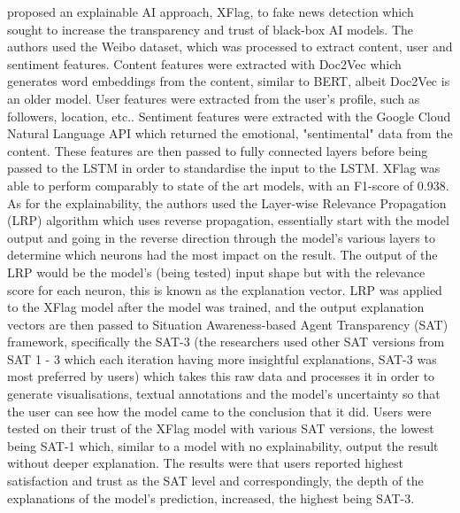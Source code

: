 \documentclass[stu,12pt,floatsintext,donotrepeattitle]{apa7}
\begin{document}
\textcite{Xflag} proposed an explainable AI approach, XFlag, to fake news detection which sought to increase the transparency and trust of black-box AI models. The authors used the Weibo dataset, which was processed to extract content, user and sentiment features. Content features were extracted with Doc2Vec which generates word embeddings from the content, similar to BERT, albeit Doc2Vec is an older model. User features were extracted from the user's profile, such as followers, location, etc.. Sentiment features were extracted with the Google Cloud Natural Language API which returned the emotional, "sentimental" data from the content. These features are then passed to fully connected layers before being passed to the LSTM in order to standardise the input to the LSTM. XFlag was able to perform comparably to state of the art models, with an F1-score of 0.938. As for the explainability, the authors used the Layer-wise Relevance Propagation (LRP) algorithm which uses reverse propagation, essentially start with the model output and going in the reverse direction through the model's various layers to determine which neurons had the most impact on the result. The output of the LRP would be the model's (being tested) input shape but with the relevance score for each neuron, this is known as the explanation vector. LRP was applied to the XFlag model after the model was trained, and the output explanation vectors are then passed to Situation Awareness-based Agent Transparency (SAT) framework, specifically the SAT-3 (the researchers used other SAT versions from SAT 1 - 3 which each iteration having more insightful explanations, SAT-3 was most preferred by users) which takes this raw data and processes it in order to generate visualisations, textual annotations and the model's uncertainty so that the user can see how the model came to the conclusion that it did. Users were tested on their trust of the XFlag model with various SAT versions, the lowest being SAT-1 which, similar to a model with no explainability, output the result without deeper explanation. The results were that users reported highest satisfaction and trust as the SAT level and correspondingly, the depth of the explanations of the model's prediction, increased, the highest being SAT-3. 
\end{document}
